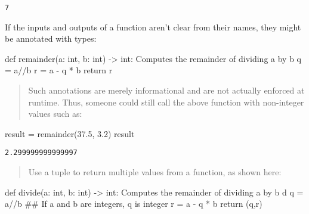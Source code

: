 \documentclass[
  letterpaper,
  DIV=11,
  numbers=noendperiod]{scrreprt}
\newenvironment{Shaded}{\begin{snugshade}}{\end{snugshade}}
\newcommand{\BuiltInTok}[1]{\textcolor[rgb]{0.00,0.46,0.62}{#1}}
\newcommand{\CommentTok}[1]{\textcolor[rgb]{0.37,0.37,0.37}{#1}}
\newcommand{\ControlFlowTok}[1]{\textcolor[rgb]{0.00,0.46,0.62}{#1}}
\newcommand{\FloatTok}[1]{\textcolor[rgb]{0.68,0.00,0.00}{#1}}
\newcommand{\KeywordTok}[1]{\textcolor[rgb]{0.00,0.46,0.62}{#1}}
\newcommand{\NormalTok}[1]{\textcolor[rgb]{0.00,0.46,0.62}{#1}}
\newcommand{\OperatorTok}[1]{\textcolor[rgb]{0.37,0.37,0.37}{#1}}
\begin{document}
\begin{verbatim}
7
\end{verbatim}

If the inputs and outputs of a function aren't clear from their names,
they might be annotated with types:

\begin{Shaded}
\begin{Highlighting}[]
\KeywordTok{def}\NormalTok{ remainder(a: }\BuiltInTok{int}\NormalTok{, b: }\BuiltInTok{int}\NormalTok{) }\OperatorTok{{-}\textgreater{}} \BuiltInTok{int}\NormalTok{:}
    \CommentTok{\textquotesingle{}\textquotesingle{}\textquotesingle{}  }
\CommentTok{    Computes    the remainder   of  dividing    a   by  b               }
\CommentTok{    \textquotesingle{}\textquotesingle{}\textquotesingle{}}                 
\NormalTok{    q   }\OperatorTok{=}\NormalTok{   a}\OperatorTok{//}\NormalTok{b}
\NormalTok{    r   }\OperatorTok{=}\NormalTok{   a }\OperatorTok{{-}}\NormalTok{ q }\OperatorTok{*}\NormalTok{ b }
    \ControlFlowTok{return}\NormalTok{  r}
\end{Highlighting}
\end{Shaded}

\begin{quote}
Such annotations are merely informational and are not actually enforced
at runtime. Thus, someone could still call the above function with
non-integer values such as:
\end{quote}

\begin{Shaded}
\begin{Highlighting}[]
\NormalTok{result  }\OperatorTok{=}\NormalTok{ remainder(}\FloatTok{37.5}\NormalTok{,   }\FloatTok{3.2}\NormalTok{)}
\NormalTok{result}
\end{Highlighting}
\end{Shaded}

\begin{verbatim}
2.299999999999997
\end{verbatim}

\begin{quote}
Use a tuple to return multiple values from a function, as shown here:
\end{quote}

\begin{Shaded}
\begin{Highlighting}[]
\KeywordTok{def}\NormalTok{ divide(a: }\BuiltInTok{int}\NormalTok{, b: }\BuiltInTok{int}\NormalTok{) }\OperatorTok{{-}\textgreater{}} \BuiltInTok{int}\NormalTok{:}
    \CommentTok{\textquotesingle{}\textquotesingle{}\textquotesingle{}  }
\CommentTok{    Computes the remainder of dividing a by b               }
\CommentTok{    d\textquotesingle{}\textquotesingle{}\textquotesingle{}}                
\NormalTok{    q   }\OperatorTok{=}\NormalTok{   a}\OperatorTok{//}\NormalTok{b }\CommentTok{\#\# If  a and b are integers, q is integer}
\NormalTok{    r   }\OperatorTok{=}\NormalTok{   a }\OperatorTok{{-}}\NormalTok{ q }\OperatorTok{*}\NormalTok{ b }
    \ControlFlowTok{return}\NormalTok{  (q,r)}
\end{Highlighting}
\end{Shaded}
\end{document}
